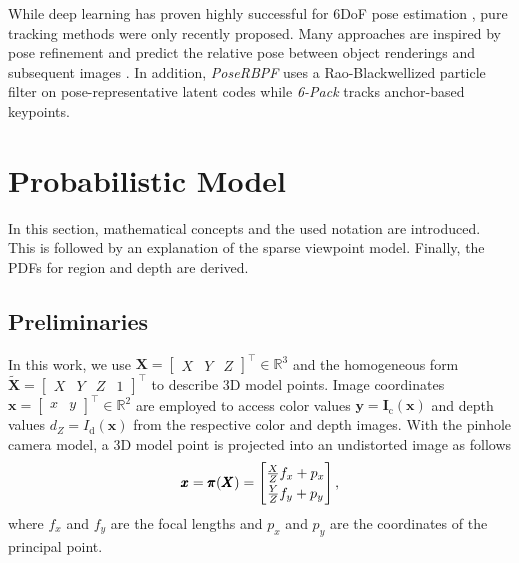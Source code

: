 \documentclass[10pt,twocolumn,letterpaper]{article}
\begin{document}
While deep learning has proven highly successful for \ac{6DoF} pose estimation \cite{Labbe2020, He2021, Wang2019b, Xiang2018, Sundermeyer2018}, pure tracking methods were only recently proposed.
Many approaches are inspired by pose refinement and predict the relative pose between object renderings and subsequent images \cite{Li2018, Manhardt2018, Wen2020}. 
In addition, \textit{PoseRBPF} \cite{Deng2021} uses a Rao-Blackwellized particle filter on pose-representative latent codes \cite{Sundermeyer2018} while \textit{6-Pack} \cite{Wang2020} tracks anchor-based keypoints.
 


\section{Probabilistic Model}\label{sec:p}
In this section, mathematical concepts and the used notation are introduced.
This is followed by an explanation of the sparse viewpoint model.
Finally, the \acp{PDF} for region and depth are derived.



\subsection{Preliminaries}\label{ssec:p0}
In this work, we use $\pmb{X} = \begin{bmatrix} X& Y& Z\end{bmatrix}^\top\in \mathbb{R}^3$ and the homogeneous form $\pmb{\widetilde{X}} = \begin{bmatrix} X& Y& Z& 1\end{bmatrix}^\top$ to describe 3D model points.
Image coordinates $\pmb{x} = \begin{bmatrix} x& y\end{bmatrix}^\top \in \mathbb{R}^2$ are employed to access color values $\pmb{y} = \pmb{I}_\textrm{c}(\pmb{x})$ and depth values $d_Z = I_\textrm{d}(\pmb{x})$ from the respective color and depth images.
With the pinhole camera model, a 3D model point is projected into an undistorted image as follows
\begin{equation}\label{eq:p01}
	\renewcommand\arraystretch{1.2}
	\pmb{x} = \pmb{\pi}(\pmb{X}) = 
	\begin{bmatrix}
		\frac{X}{Z}f_x + p_x\\
		\frac{Y}{Z}f_y + p_y
	\end{bmatrix},
\end{equation}
where $f_x$ and $f_y$ are the focal lengths and $p_x$ and $p_y$ are the coordinates of the principal point.
\end{document}
